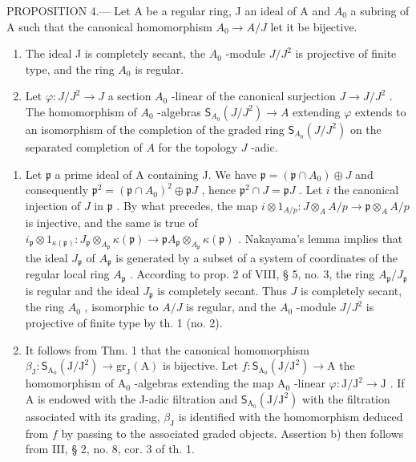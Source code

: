 PROPOSITION 4.--- Let A be a regular ring, J an ideal of A and \(A_{0}\) a subring of A such that the canonical homomorphism \(A_{0} \rightarrow A/J\) let it be bijective.

\begin{enumerate}
\def\labelenumi{\alph{enumi})}
\item
  The ideal J is completely secant, the \(A_{0}\) -module \(J/J^{2}\) is projective of finite type, and the ring \(A_{0}\) is regular.
\item
  Let \(\varphi: J/J^{2} \to J\) a section \(A_{0}\) -linear of the canonical surjection \(J \to J/J^{2}\) . The homomorphism of \(A_{0}\) -algebras \(\mathsf{S}_{A_{0}}(J/J^{2}) \longrightarrow A\) extending \(\varphi\) extends to an isomorphism of the completion of the graded ring \(\mathsf{S}_{A_{0}}(J/J^{2})\) on the separated completion of \(A\) for the topology \(J\) -adic.
\end{enumerate}

\begin{enumerate}
\def\labelenumi{\alph{enumi})}
\item
  Let \(\mathfrak{p}\) a prime ideal of A containing J. We have \(\mathfrak{p} = (\mathfrak{p} \cap A_0) \oplus J\) and consequently \(\mathfrak{p}^2 = (\mathfrak{p} \cap A_0)^2 \oplus \mathfrak{p}J\) , hence \(\mathfrak{p}^2 \cap J = \mathfrak{p}J\) . Let \(i\) the canonical injection of \(J\) in \(\mathfrak{p}\) . By what precedes, the map \(i \otimes 1_{A/p}: J \otimes_A A/p \longrightarrow \mathfrak{p} \otimes_A A/p\) is injective, and the same is true of \(i_{\mathfrak{p}} \otimes 1_{\kappa(\mathfrak{p})}: J_{\mathfrak{p}} \otimes_{A_{\mathfrak{p}}} \kappa(\mathfrak{p}) \longrightarrow \mathfrak{p}A_{\mathfrak{p}} \otimes_{A_{\mathfrak{p}}} \kappa(\mathfrak{p})\) . Nakayama's lemma implies that the ideal \(J_{\mathfrak{p}}\) of \(A_{\mathfrak{p}}\) is generated by a subset of a system of coordinates of the regular local ring \(A_{\mathfrak{p}}\) . According to prop. 2 of VIII, § 5, no. 3, the ring \(A_{\mathfrak{p}}/J_{\mathfrak{p}}\) is regular and the ideal \(J_{\mathfrak{p}}\) is completely secant. Thus \(J\) is completely secant, the ring \(A_0\) , isomorphic to \(A/J\) is regular, and the \(A_0\) -module \(J/J^2\) is projective of finite type by th. 1 (no. 2).
\item
  It follows from Thm. 1 that the canonical homomorphism \(\beta_{\mathrm{J}}: \mathsf{S}_{\mathrm{A}_{0}}(\mathrm{J}/\mathrm{J}^{2}) \longrightarrow \mathrm{gr}_{\mathrm{J}}(\mathrm{A})\) is bijective. Let \(f: \mathsf{S}_{\mathrm{A}_{0}}(\mathrm{J}/\mathrm{J}^{2}) \longrightarrow \mathrm{A}\) the homomorphism of \(\mathrm{A}_{0}\) -algebras extending the map \(\mathrm{A}_{0}\) -linear \(\varphi: \mathrm{J}/\mathrm{J}^{2} \longrightarrow \mathrm{J}\) . If A is endowed with the J-adic filtration and \(\mathsf{S}_{\mathrm{A}_{0}}(\mathrm{J}/\mathrm{J}^{2})\) with the filtration associated with its grading, \(\beta_{\mathrm{J}}\) is identified with the homomorphism deduced from \(f\) by passing to the associated graded objects. Assertion b) then follows from III, § 2, no. 8, cor. 3 of th. 1.
\end{enumerate}

